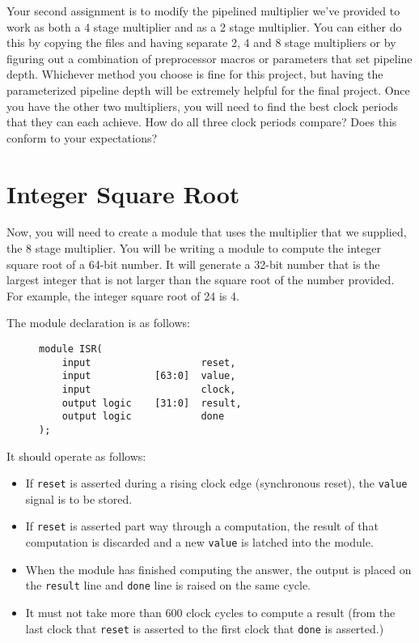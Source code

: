 \documentclass{article}
\begin{document}
Your second assignment is to modify the pipelined multiplier we've provided to
work as both a 4 stage multiplier and as a 2 stage multiplier. You can either
do this by copying the files and having separate 2, 4 and 8 stage multipliers or
by figuring out a combination of preprocessor macros or parameters that set
pipeline depth. Whichever method you choose is fine for this project, but having
the parameterized pipeline depth will be extremely helpful for the final
project. Once you have the other two multipliers, you will need to find the best
clock periods that they can each achieve. How do all three clock periods
compare? Does this conform to your expectations?

\section{Integer Square Root} 
\label{sec:isr}
Now, you will need to create a module that uses the multiplier that we supplied,
the 8 stage multiplier. You will be writing a module to compute the integer
square root of a 64-bit number. It will generate a 32-bit number that is the
largest integer that is not larger than the square root of the number provided.
For example, the integer square root of 24 is 4.

The module declaration is as follows:
\begin{figure}[H]
	\begin{verbatim}
module ISR(
	input   				reset,
	input   		[63:0]  value,
	input   				clock,
	output logic    [31:0]  result,
	output logic            done
);
	\end{verbatim}
\end{figure}
It should operate as follows:
\begin{itemize}
	\item If \texttt{reset} is asserted during a rising clock edge (synchronous
		reset), the \texttt{value} signal is to be stored.
	\item If \texttt{reset} is asserted part way through a computation, the
		result of that computation is discarded and a new \texttt{value} is
		latched into the module.
	\item When the module has finished computing the answer, the output is
		placed on the \texttt{result} line and \texttt{done} line is raised on the same cycle.
	\item It must not take more than 600 clock cycles to compute a result (from
		the last clock that \texttt{reset} is asserted to the first clock that
		\texttt{done} is asserted.)
\end{itemize}
\end{document}
